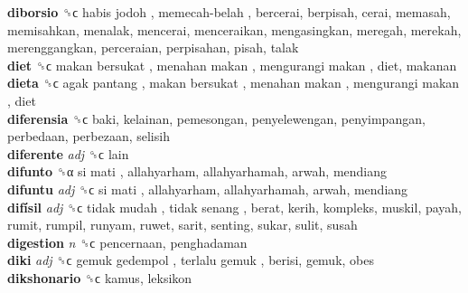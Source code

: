 \textbf{diborsio} ␝ϲ   habis jodoh ,  memecah-belah , bercerai, berpisah, cerai, memasah, memisahkan, menalak, mencerai, menceraikan, mengasingkan, meregah, merekah, merenggangkan, perceraian, perpisahan, pisah, talak  \\
\textbf{diet} ␝ϲ   makan bersukat ,  menahan makan ,  mengurangi makan , diet, makanan  \\
\textbf{dieta} ␝ϲ   agak pantang ,  makan bersukat ,  menahan makan ,  mengurangi makan , diet  \\
\textbf{diferensia} ␝ϲ  baki, kelainan, pemesongan, penyelewengan, penyimpangan, perbedaan, perbezaan, selisih  \\
\textbf{diferente} \emph{adj}  ␝ϲ  lain  \\
\textbf{difunto} ␝α   si mati , allahyarham, allahyarhamah, arwah, mendiang  \\
\textbf{difuntu} \emph{adj}  ␝ϲ   si mati , allahyarham, allahyarhamah, arwah, mendiang  \\
\textbf{difísil} \emph{adj}  ␝ϲ   tidak mudah ,  tidak senang , berat, kerih, kompleks, muskil, payah, rumit, rumpil, runyam, ruwet, sarit, senting, sukar, sulit, susah  \\
\textbf{digestion} \emph{n}  ␝ϲ  pencernaan, penghadaman  \\
\textbf{diki} \emph{adj}  ␝ϲ   gemuk gedempol ,  terlalu gemuk , berisi, gemuk, obes  \\
\textbf{dikshonario} ␝ϲ  kamus, leksikon  \\

